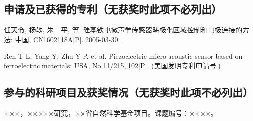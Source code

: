 \begin{resume}
  \subsection{申请及已获得的专利（无获奖时此项不必列出）}

  \begin{achievements}
    \item 任天令, 杨轶, 朱一平, 等. 硅基铁电微声学传感器畴极化区域控制和电极连接的方法: 中国, CN1602118A[P]. 2005-03-30.
    \item Ren T L, Yang Y, Zhu Y P, et al. Piezoelectric micro acoustic sensor based on ferroelectric materials: USA, No.11/215, 102[P]. (美国发明专利申请号.)
  \end{achievements}

  \subsection{参与的科研项目及获奖情况（无获奖时此项不必列出）}
  \begin{achievements}
    \item ×××，×××××研究，××省自然科学基金项目。课题编号：××××。
  \end{achievements}

\end{resume}
